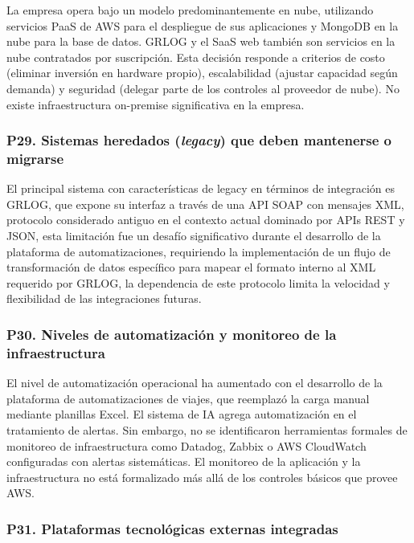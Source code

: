 \documentclass[12pt]{article}
\begin{document}
La empresa opera bajo un modelo predominantemente en nube, utilizando servicios
PaaS de AWS para el despliegue de sus aplicaciones y MongoDB en la nube para la base de
datos. GRLOG y el SaaS web tambi\'en son servicios en la nube contratados por suscripci\'on.
Esta decisi\'on responde a criterios de costo (eliminar inversi\'on en hardware propio),
escalabilidad (ajustar capacidad seg\'un demanda) y seguridad (delegar parte de los controles
al proveedor de nube). No existe infraestructura on-premise significativa en la empresa.

\subsubsection*{\textbf{P29. Sistemas heredados (\textit{legacy}) que deben mantenerse o migrarse}}

El principal sistema con caracter\'isticas de legacy en t\'erminos de integraci\'on es
GRLOG, que expone su interfaz a trav\'es de una API SOAP con mensajes
XML, protocolo considerado antiguo en el contexto actual dominado por APIs REST y JSON,
esta limitaci\'on fue un desaf\'io significativo durante el desarrollo de la plataforma de
automatizaciones, requiriendo la implementaci\'on de un flujo de transformaci\'on de datos
espec\'ifico para mapear el formato interno al XML requerido por GRLOG, la dependencia de
este protocolo limita la velocidad y flexibilidad de las integraciones futuras.

\subsubsection*{\textbf{P30. Niveles de automatizaci\'on y monitoreo de la infraestructura}}

El nivel de automatizaci\'on operacional ha aumentado con el desarrollo de la plataforma
de automatizaciones de viajes, que reemplaz\'o la carga manual mediante planillas Excel.
El sistema de IA agrega automatizaci\'on en el tratamiento de alertas.
Sin embargo, no se identificaron herramientas formales de monitoreo de infraestructura
como Datadog, Zabbix o AWS CloudWatch configuradas con alertas sistem\'aticas. El monitoreo
de la aplicaci\'on y la infraestructura no est\'a formalizado m\'as all\'a de los controles
b\'asicos que provee AWS.

\subsubsection*{\textbf{P31. Plataformas tecnol\'ogicas externas integradas}}
\end{document}
